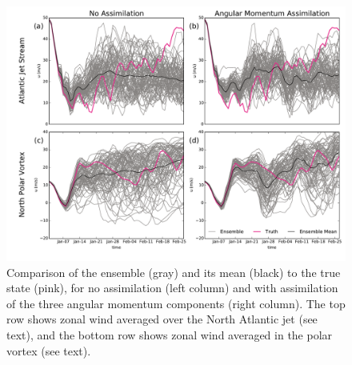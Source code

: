  \begin{figure}
	 \includegraphics[width=\textwidth]{Paper_figures/ERPDA_paper_point_checks.pdf}
	 \caption{Comparison of the ensemble (gray) and its mean (black) to the true state (pink), for no assimilation (left column) and with assimilation of the three angular momentum components (right column). The top row shows zonal wind averaged over the North Atlantic jet (see text), and the bottom row shows zonal wind averaged in the polar vortex (see text).}
	 \label{fig:point_checks}
\end{figure}




